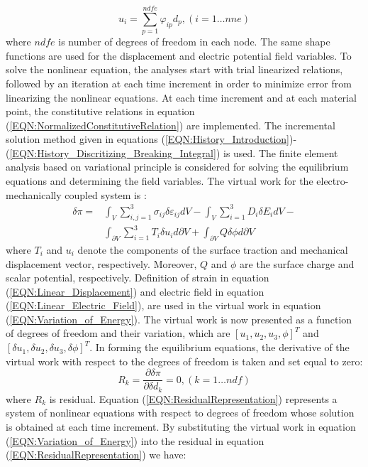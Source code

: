 \begin{equation}
u_i=
\sum _{p=1}^{ndfe} \varphi_{ip} d_p,(i=1\dots nne)
\label{EQN:DispShapeDof}
\end{equation}
where $ndfe$ is number of degrees of freedom in each node.
The same shape functions are used for the displacement and electric potential field variables. 
To solve the nonlinear equation, the analyses start with trial linearized relations, followed by an iteration at each time increment 
in order to minimize error from linearizing the nonlinear equations.
At each time increment and at each material point, the constitutive relations in equation (\ref{EQN:NormalizedConstitutiveRelation}) are implemented. 
The incremental solution method given in equations (\ref{EQN:History_Introduction})-(\ref{EQN:History_Discritizing_Breaking_Integral}) is used.
The finite element analysis based on variational principle is considered for solving the equilibrium equations and determining the field variables.
The virtual work for the  electro-mechanically coupled system is \cite{Benjeddou2000,tiersten1993electroelastic}:
\begin{equation} 
\begin{aligned}
\delta \pi= 
& \int_V 
\sum_{i,j=1}^3 \sigma_{ij}\delta \varepsilon_{ij} dV -
\int_V 
\sum_{i=1}^3 D_{i}\delta E_{i} dV- \\
&\int_{\partial V}
\sum_{i=1}^3 T_{i}\delta u_{i} d{\partial V}+
\int_{\partial V} 
Q\delta \phi d{\partial V}
\label{EQN:Variation_of_Energy}
\end{aligned}
\end{equation}
where $T_{i}$ and $u_{i}$ denote the components of the surface traction and mechanical displacement vector, respectively.
Moreover, $Q$ and $\phi$ are the surface charge and scalar potential, respectively.
Definition of strain in equation (\ref{EQN:Linear_Displacement}) and electric field in equation (\ref{EQN:Linear_Electric_Field}), are used in the virtual work in equation (\ref{EQN:Variation_of_Energy}). 
The virtual work is now presented as a function of degrees of freedom and their variation, which are $[u_1,u_2,u_3,\phi]^T$ and $[\delta u_1,\delta u_2,\delta u_3,\delta \phi]^T$. 
In forming the equilibrium equations, the derivative of the virtual work with respect to the degrees of freedom is taken and set equal to zero:
\begin{equation}
R_k=\frac{\partial \delta \pi}{\partial \delta d_k}=0 ,(k=1\dots ndf)
\label{EQN:ResidualRepresentation}
\end{equation}
where $R_k$ is residual. Equation (\ref{EQN:ResidualRepresentation}) represents a system of nonlinear equations with respect to degrees of freedom whose solution is obtained at each time increment. 
By substituting the virtual work in equation (\ref{EQN:Variation_of_Energy}) into the residual in equation (\ref{EQN:ResidualRepresentation}) we have:

